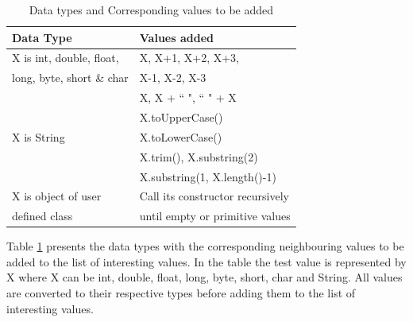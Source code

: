 \documentclass[conference]{IEEEtran}
\begin{document}


\begin{table}[ht]
\caption{Data types and Corresponding values to be added} %
\centering %
\begin{tabular}{| l | l |} %
\hline %
Data Type & Values added\\ [0.5ex] %
\hline %
\multirow{1}{*}{X is int, double, float, } & X,  X+1, X+2, X+3,  \\ %
\multirow{1}{*}{long, byte, short \& char} & X-1, X-2, X-3 \\ 

\hline
\multirow{5}{*}{X is String} & X, X + ``  ", ``  " + X \\ %
& X.toUpperCase() \\
& X.toLowerCase() \\
& X.trim(), X.substring(2) \\
& X.substring(1, X.length()-1) \\
\hline
\multirow{1}{*}{X is object of user} & Call its constructor recursively \\ %
\multirow{1}{*}{defined class} & until empty or primitive values \\[1ex]
\hline %
\end{tabular}
\bigskip
\label{table:addvalues} %
\end{table}





\noindent Table \ref{table:addvalues} presents the data types with the corresponding neighbouring values to be added to the list of interesting values. In the table the test value is represented by X where X can be int, double, float, long, byte, short, char and String. All values are converted to their respective types before adding them to the list of interesting values.
\end{document}
